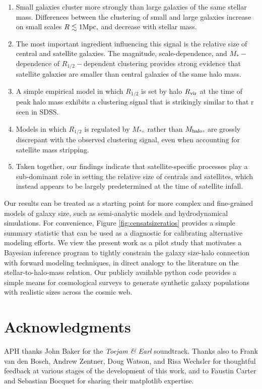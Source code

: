 \documentclass[usenatbib,usegraphicx,letterpaper]{mn2e}
\newcommand{\ben}{\begin{enumerate}}
\newcommand{\een}{\end{enumerate}}
\newcommand{\rhalf}{R_{1/2}}
\newcommand{\mstar}{M_{\ast}}
\newcommand{\mhalo}{M_{\rm halo}}
\newcommand{\rvir}{R_{\rm vir}}
\newcommand{\mpc}{{\rm Mpc}}
\begin{document}
\ben
\item Small galaxies cluster more strongly than large galaxies of the same stellar mass. Differences between the clustering of small and large galaxies increase on small scales $R\lesssim1\mpc,$ and decrease with stellar mass.
\item The most important ingredient influencing this signal is the relative size of central and satellite galaxies. The magnitude, scale-dependence, and $\mstar-$dependence of $\rhalf-$dependent clustering provides strong evidence that satellite galaxies are smaller than central galaxies of the same halo mass.
\item A simple empirical model in which $\rhalf$ is set by halo $\rvir$ at the time of peak halo mass exhibits a clustering signal that is strikingly similar to that r seen in SDSS.
\item Models in which $\rhalf$ is regulated by $\mstar,$ rather than $\mhalo,$ are grossly discrepant with the observed clustering signal, even when accounting for satellite mass stripping.
\item Taken together, our findings indicate that satellite-specific processes play a sub-dominant role in setting the relative size of centrals and satellites, which instead appears to be largely predetermined at the time of satellite infall.
\een

Our results can be treated as a starting point for more complex and fine-grained models of galaxy size, such as semi-analytic models and hydrodynamical simulations. For convenience, Figure \ref{fig:censatsizeratios} provides a simple summary statistic that can be used as a diagnostic for calibrating alternative modeling efforts. We view the present work as a pilot study that motivates a Bayesian inference program to tightly constrain the galaxy size-halo connection with forward modeling techniques, in direct analogy to the literature on the stellar-to-halo-mass relation. Our publicly available python code provides a simple means for cosmological surveys to generate synthetic galaxy populations with realistic sizes across the cosmic web.

\section*{Acknowledgments}

APH thanks John Baker for the {\em Toejam \& Earl} soundtrack. Thanks also to Frank van den Bosch, Andrew Zentner, Doug Watson, and Risa Wechsler for thoughtful feedback at various stages of the development of this work, and to Faustin Carter and Sebastian Bocquet for sharing their matplotlib expertise.
\end{document}
